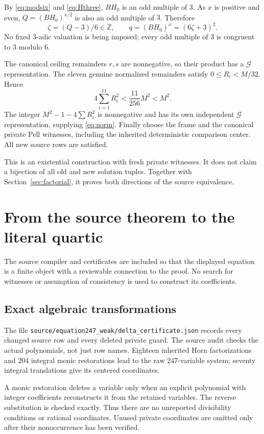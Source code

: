 \documentclass[11pt,letterpaper]{article}
\newcommand{\ZZ}{\mathbb Z}
\newcommand{\G}{\mathcal G}
\newcommand{\file}[1]{\texttt{\nolinkurl{#1}}}
\begin{document}
By \eqref{eq:modsix} and \eqref{eq:Hthree}, $BH_0$ is an odd
multiple of $3$. As $x$ is positive and even,
$Q=(BH_0)^{x/2}$ is also an odd multiple of $3$. Therefore
\[
 \zeta=(Q-3)/6\in\ZZ,\qquad q=(BH_0)^x=(6\zeta+3)^2.
\]
No fixed $3$-adic valuation is being imposed; every odd multiple of
$3$ is congruent to $3$ modulo $6$.

The canonical ceiling remainders $r,s$ are nonnegative, so their
product has a $\G$ representation. The eleven genuine normalized
remainders satisfy $0\le R_i<M/32$. Hence
\[
 4\sum_{i=1}^{11}R_i^2<\frac{11}{256}M^2<M^2.
\]
The integer $M^2-1-4\sum R_i^2$ is nonnegative and has its own
independent $\G$ representation, supplying \eqref{eq:norm}.
Finally choose the frame and the canonical private Pell witnesses,
including the inherited deterministic comparison center. All new
source rows are satisfied.

This is an existential construction with fresh private witnesses.
It does not claim a bijection of all old and new solution tuples.
Together with Section~\ref{sec:factorial}, it proves both directions
of the source equivalence.

\section{From the source theorem to the literal quartic}
\label{sec:compile}

The source compiler and certificates are included so that the displayed
equation is a finite object with a reviewable connection to the proof.
No search for witnesses or assumption of consistency is used to
construct its coefficients.

\subsection{Exact algebraic transformations}

The file \file{source/equation247_weak/delta_certificate.json}
records every changed source row and every deleted private guard.
The source audit checks the actual polynomials, not just row names.
Eighteen inherited Horn factorizations and 204 integral monic
restorations lead to the raw 247-variable system; seventy integral
translations give its centered coordinates.

A monic restoration deletes a variable only when an explicit polynomial
with integer coefficients reconstructs it from the retained variables.
The reverse substitution is checked exactly. Thus there are no
unreported divisibility conditions or rational coordinates.
Unused private coordinates are omitted only after their nonoccurrence
has been verified.
\end{document}
